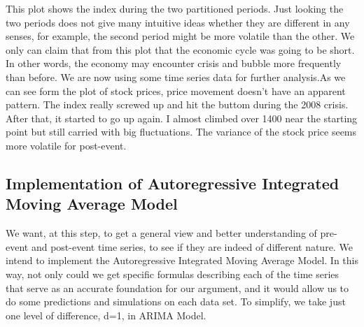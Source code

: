 \documentclass[letterpaper,10pt,english]{/Users/edwsurewin/anaconda/lib/python2.7/site-packages/sphinx/texinputs/sphinxhowto}
\begin{document}
This plot shows the index during the two partitioned periods. Just
looking the two periods does not give many intuitive ideas whether they
are different in any senses, for example, the second period might be
more volatile than the other. We only can claim that from this plot that
the economic cycle was going to be short. In other words, the economy
may encounter crisis and bubble more frequently than before. We are now
using some time series data for further analysis.As we can see form the plot of stock prices, price movement doesn't have
an apparent pattern. The index really screwed up and hit the buttom
during the 2008 crisis. After that, it started to go up again. I almost
climbed over 1400 near the starting point but still carried with big
fluctuations. The variance of the stock price seems more volatile for
post-event.\subsection{Implementation of Autoregressive Integrated Moving Average
Model}\label{implementation-of-autoregressive-integrated-moving-average-model}We want, at this step, to get a general view and better understanding of
pre-event and post-event time series, to see if they are indeed of
different nature. We intend to implement the Autoregressive Integrated
Moving Average Model. In this way, not only could we get specific
formulas describing each of the time series that serve as an accurate
foundation for our argument, and it would allow us to do some
predictions and simulations on each data set. To simplify, we take just
one level of difference, d=1, in ARIMA Model.

\end{document}
